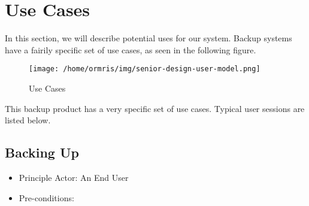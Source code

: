 \section{Use Cases}
In this section, we will describe potential uses for our system. Backup systems have a fairily specific set of use cases, as seen in the following figure.

\begin{figure}[h]
\centering\texttt{[image: /home/ormris/img/senior-design-user-model.png]}
\caption{Use Cases}
\end{figure}

This backup product has a very specific set of use cases. Typical user sessions are listed below.

\subsection{Backing Up}
\begin{itemize}
	\item Principle Actor: An End User
	\item Pre-conditions:
		\begin{itemize}
		\end{itemize}
\end{itemize}

